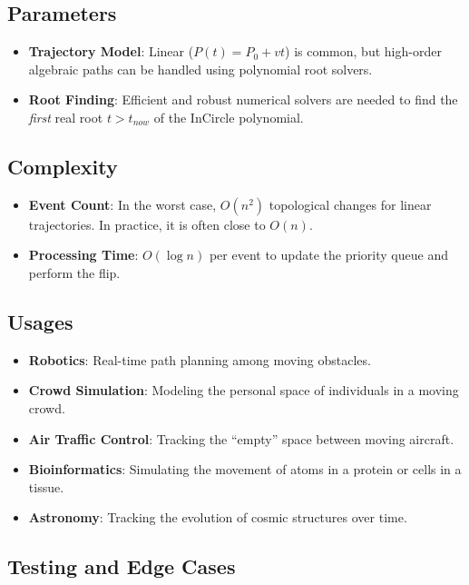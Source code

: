 \subsection{Parameters}

\begin{itemize}
\item \textbf{Trajectory Model}: Linear ($P(t) = P_0 + vt$) is common, but high-order algebraic paths can be handled using polynomial root solvers.
\item \textbf{Root Finding}: Efficient and robust numerical solvers are needed to find the \emph{first} real root $t > t_{now}$ of the InCircle polynomial.
\end{itemize}

\subsection{Complexity}

\begin{itemize}
\item \textbf{Event Count}: In the worst case, $O(n^2)$ topological changes for linear trajectories. In practice, it is often close to $O(n)$.
\item \textbf{Processing Time}: $O(\log n)$ per event to update the priority queue and perform the flip.
\end{itemize}

\subsection{Usages}

\begin{itemize}
\item \textbf{Robotics}: Real-time path planning among moving obstacles.
\item \textbf{Crowd Simulation}: Modeling the personal space of individuals in a moving crowd.
\item \textbf{Air Traffic Control}: Tracking the ``empty'' space between moving aircraft.
\item \textbf{Bioinformatics}: Simulating the movement of atoms in a protein or cells in a tissue.
\item \textbf{Astronomy}: Tracking the evolution of cosmic structures over time.
\end{itemize}

\subsection{Testing and Edge Cases}

